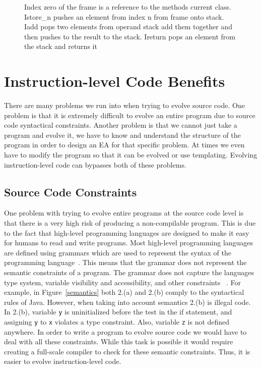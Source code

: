 \documentclass{sig-alternate}
\begin{document}
\begin{figure}
\centering
{}

\caption{Index zero of the frame is a reference to the methods current class. Istore\_n pushes an element from index n from frame onto stack. Iadd pops two elements from operand stack add them together and then pushes to the result to the stack. Ireturn pops an element from the stack and returns it}
\label{stack}
\end{figure}

\section{Instruction-level Code Benefits}

There are many problems we run into when trying to evolve source code. One problem is that it is extremely difficult to evolve an entire program due to source code syntactical constraints. Another problem is that we cannot just take a program and evolve it, we have to know and understand the structure of the program in order to design an EA for that specific problem. At times we even have to modify the program so that it can be evolved or use templating. Evolving instruction-level code can bypasses both of these problems.

\subsection{Source Code Constraints}
One problem with trying to evolve entire programs at the source code level is that there is a very high risk of producing a non-compilable program. This is due to the fact that high-level programming languages are designed to make it easy for humans to read and write programs. Most high-level programming languages are defined using grammars which are used to represent the syntax of the programming language~\cite{Oracle:2013,Assembly:2010}. This means that the grammar does not represent the semantic constraints of a program. The grammar does not capture the languages type system, variable visibility and accessibility, and other constraints ~\cite{FINCH:2011}. For example, in Figure~\ref{semantics} both 2.(a) and 2.(b) comply to the syntactical rules of Java. However, when taking into account semantics 2.(b) is illegal code. In 2.(b), variable \texttt{y} is uninitialized before the test in the if statement, and assigning \texttt{y} to \texttt{x} violates a type constraint. Also, variable \texttt{z} is not defined anywhere.  In order to write a program to evolve source code we would have to deal with all these constraints. While this task is possible it would require creating a full-scale compiler to check for these semantic constraints. Thus, it is easier to evolve instruction-level code. \par
\end{document}
